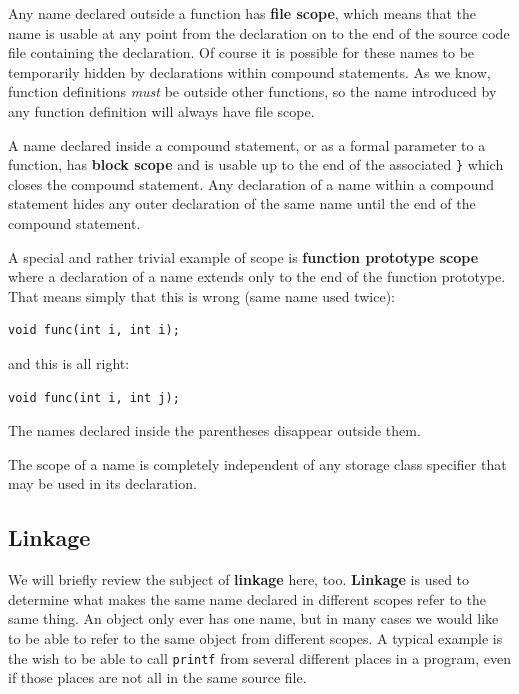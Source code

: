   Any name declared outside a function has \textbf{file scope}, which
    means that the name is usable at any point from the declaration on to
    the end of the source code file containing the declaration. Of course it
    is possible for these names to be temporarily hidden by declarations
    within compound statements. As we know, function definitions
    \textit{must} be outside other functions, so the name introduced by any
    function definition will always have file scope.


   A name declared inside a compound statement, or as a formal parameter
    to a function, has \textbf{block scope} and is usable up to the end of
    the associated \texttt{\}} which closes the compound statement. Any
    declaration of a name within a compound statement hides any outer
    declaration of the same name until the end of the compound
    statement.


   A special and rather trivial example of scope is \textbf{function
    prototype scope} where a declaration of a name extends only to the
    end of the function prototype. That means simply that this is wrong
    (same name used twice):


\begin{Verbatim}
void func(int i, int i);
\end{Verbatim}

   and this is all right:


\begin{Verbatim}
void func(int i, int j);
\end{Verbatim}

   The names declared inside the parentheses disappear outside them.


   The scope of a name is completely independent of any storage class
    specifier that may be used in its declaration.


  

  \subsection{Linkage}
   

   We will briefly review the subject of \textbf{linkage} here, too.
    \textbf{Linkage} is used to determine what makes the same name
    declared in different scopes refer to the same thing. An object only
    ever has one name, but in many cases we would like to be able to refer
    to the same object from different scopes. A typical example is the wish
    to be able to call \texttt{printf} from several different places in
    a program, even if those places are not all in the same source file.


